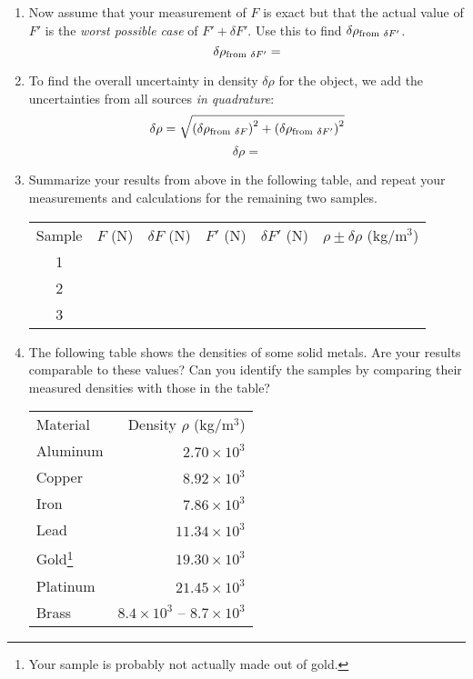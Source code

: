 \begin{enumerate}[labparts]
\item Now assume that your measurement of $F$ is exact but that the actual value of $F'$ is the \textit{worst possible case} of $F' + \delta F'$.  Use this to find $\delta \rho_{{\rm from~} \delta F'}$.
\answerspace{0.75in}
$$
\delta \rho_{{\rm from~} \delta F'} =
$$

\item To find the overall uncertainty in density $\delta \rho$ for the object, we add the uncertainties from all sources \textit{in quadrature}:
$$
\delta \rho = \sqrt{\left( \delta \rho_{{\rm from~} \delta F} \right)^2 + \left( \delta \rho_{{\rm from~} \delta F'} \right)^2}
$$
\answerspace{0.5in}
$$
\delta \rho =
$$

\item Summarize your results from above in the following table, and repeat your measurements and calculations for the remaining two samples.

\begin{center} 
{\renewcommand{\arraystretch}{1.5}
\begin{tabular}{|c|C{0.7in}|C{0.7in}|C{0.7in}|C{0.7in}|C{1.7in}|} 
\hline
Sample & $F$ (N) & $\delta F$ (N) & $F'$ (N) & $\delta F'$ (N) & $\rho \pm \delta \rho$ (kg/m$^3$) \\ 
\hhline{|=|=|=|=|=|=|}
1 & & & & & \\ 
 & & & & & \\ 
 & & & & & \\ 
\hline 
\end{tabular} 
}
\end{center}


\pagebreak[2]
\item The following table shows the densities of some solid metals. Are your results comparable to these values?  Can you identify the samples by comparing their measured densities with those in the table? 

\begin{center} 
{\renewcommand{\arraystretch}{1.1}
\begin{tabularx}{2.5in}{|X|r|} 
\hline
Material & Density $\rho $ (kg/m$^3$) \\ 
\hhline{|=|=|}
Aluminum &  $2.70 \times 10^3$ \\ 
\hline 
Copper &  $8.92 \times 10^3$ \\ 
\hline 
Iron &  $7.86 \times 10^3$ \\ 
\hline 
Lead &  $11.34 \times 10^3$ \\ 
\hline 
Gold\footnote{Your sample is probably not actually made out of gold.} &  $19.30 \times 10^3$ \\ 
\hline 
Platinum &  $21.45 \times 10^3$ \\ 
\hline 
Brass &  $8.4 \times 10^3$ -- $8.7 \times 10^3$\\ 
\hline 
\end{tabularx} 
}
\end{center}

\end{enumerate}



